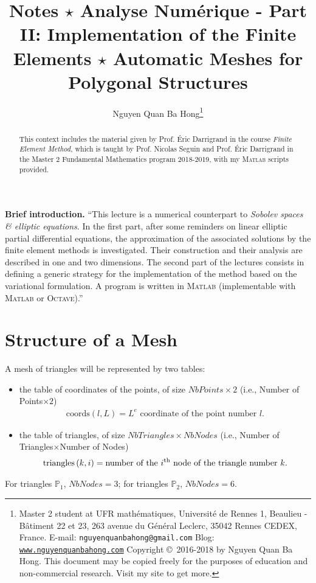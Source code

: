 \documentclass[11pt,a4paper,center,notitlepage]{article}
\title{Notes $\star$ Analyse Num\'erique - Part II: Implementation of the Finite Elements $\star$ Automatic Meshes for Polygonal Structures}
\author{Nguyen Quan Ba Hong\footnote{Master 2 student at UFR math\'ematiques, Universit\'e de Rennes 1, Beaulieu - B\^atiment 22 et 23, 263 avenue du G\'en\'eral Leclerc, 35042 Rennes CEDEX, France.\newline
E-mail: \texttt{nguyenquanbahong@gmail.com} \newline
Blog: \texttt{\url{www.nguyenquanbahong.com}} \newline 
Copyright \copyright\ 2016-2018 by Nguyen Quan Ba Hong. This document may be copied freely for the purposes of education and non-commercial research. Visit my site to get more.}}
\numberwithin{equation}{section}
\begin{document}
\maketitle
\begin{abstract}
This context includes the material given by Prof. \'Eric Darrigrand in the course \textit{Finite Element Method}, which is taught by Prof. Nicolas Seguin and Prof. \'Eric Darrigrand  in the Master 2 Fundamental Mathematics program 2018-2019, with my \textsc{Matlab} scripts provided.
\end{abstract}
%
\maketitle
\textbf{Brief introduction.} ``This lecture is a numerical counterpart to \textit{Sobolev spaces \& elliptic equations}. In the first part, after some reminders on linear elliptic partial differential equations, the approximation of the associated solutions by the finite element methods is investigated. Their construction and their analysis are described in one and two dimensions. The second part of the lectures consists in defining a generic strategy for the implementation of the method based on the variational formulation. A program is written in \textsc{Matlab} (implementable with \textsc{Matlab} or \textsc{Octave}).''
\newpage
\tableofcontents
\newpage

\section{Structure of a Mesh}
A mesh of triangles will be represented by two tables: 
\begin{itemize}
\item the table of coordinates of the points, of size $NbPoints \times 2$ (i.e., Number of Points$\times 2$)
\begin{align}
\mbox{coords}\left(l,L\right) = L^e \mbox{ coordinate of the point number }l.
\end{align}
\item the table of triangles, of size $NbTriangles \times NbNodes$ (i.e., Number of Triangles$\times$Number of Nodes)
\begin{align}
\mbox{triangles}\left(k,i\right) = \mbox{number of the }i^{\rm th} \mbox{ node of the triangle number } k.
\end{align}
\end{itemize}
For triangles $\mathbb{P}_1$, $NbNodes =3$; for triangles $\mathbb{P}_2$, $NbNodes =6$.
\end{document}
